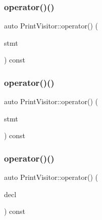 \mbox{\label{struct_print_visitor_a4cb9e06de37324a01f256b55ccc23e63}} 
\subsubsection{\texorpdfstring{operator()()}{operator()()}\hspace{0.1cm}{\footnotesize\ttfamily [30/38]}}
{\footnotesize\ttfamily auto Print\+Visitor\+::operator() (\begin{DoxyParamCaption}\item[{const \hyperlink{struct_try_statement}{Try\+Statement} \&}]{stmt }\end{DoxyParamCaption}) const\hspace{0.3cm}{\ttfamily [inline]}}

\mbox{\label{struct_print_visitor_a17ca87eeae2aa16b58cf1b31742eb4d5}} 
\subsubsection{\texorpdfstring{operator()()}{operator()()}\hspace{0.1cm}{\footnotesize\ttfamily [31/38]}}
{\footnotesize\ttfamily auto Print\+Visitor\+::operator() (\begin{DoxyParamCaption}\item[{const \hyperlink{struct_debugger_statement}{Debugger\+Statement} \&}]{stmt }\end{DoxyParamCaption}) const\hspace{0.3cm}{\ttfamily [inline]}}

\mbox{\label{struct_print_visitor_a6a9be1713bd30421f55b7606f00dbcd8}} 
\subsubsection{\texorpdfstring{operator()()}{operator()()}\hspace{0.1cm}{\footnotesize\ttfamily [32/38]}}
{\footnotesize\ttfamily auto Print\+Visitor\+::operator() (\begin{DoxyParamCaption}\item[{const \hyperlink{struct_function_declaration}{Function\+Declaration} \&}]{decl }\end{DoxyParamCaption}) const\hspace{0.3cm}{\ttfamily [inline]}}

